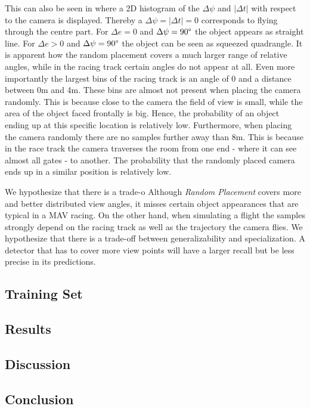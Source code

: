 This can also be seen in  where a 2D histogram of the $\Delta \psi$ and $|\Delta t|$ with respect to the camera is displayed. Thereby a $\Delta \psi = |\Delta t| = 0$ corresponds to flying through the centre part. For $\Delta e = 0$ and $\Delta \psi = 90\degree$ the object appears as straight line. For $\Delta e > 0$ and $\Delta \psi = 90\degree$ the object can be seen as squeezed quadrangle. It is apparent how the random placement covers a much larger range of relative angles, while in the racing track certain angles do not appear at all. Even more importantly the largest bins of the racing track is an angle of 0 and a distance between 0m and 4m. These bins are almost not present when placing the camera randomly. This is because close to the camera the field of view is small, while the area of the object faced frontally is big. Hence, the probability of an object ending up at this specific location is relatively low. Furthermore, when placing the camera randomly there are no samples further away than 8m. This is because in the race track the camera traverses the room from one end - where it can see almost all gates - to another. The probability that the randomly placed camera ends up in a similar position is relatively low.

We hypothesize that there is a trade-o
Although \textit{Random Placement} covers more and better distributed view angles, it misses certain object appearances that are typical in a \ac{MAV} racing. On the other hand, when simulating a flight the samples strongly depend on the racing track as well as the trajectory the camera flies. We hypothesize that there is a trade-off between generalizability and specialization. A detector that has to cover more view points will have a larger recall but be less precise in its predictions. 


\subsection{Training Set}

\subsection{Results}
\subsection{Discussion}
\subsection{Conclusion}

